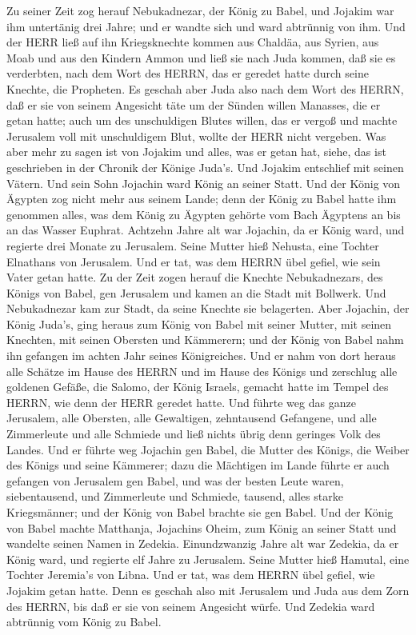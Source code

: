  Zu seiner Zeit zog herauf Nebukadnezar, der König zu Babel,
und Jojakim war ihm untertänig drei Jahre; und er wandte sich und ward
abtrünnig von ihm.  Und der HERR ließ auf ihn Kriegsknechte
kommen aus Chaldäa, aus Syrien, aus Moab und aus den Kindern Ammon und
ließ sie nach Juda kommen, daß sie es verderbten, nach dem Wort des
HERRN, das er geredet hatte durch seine Knechte, die Propheten.
 Es geschah aber Juda also nach dem Wort des HERRN, daß er
sie von seinem Angesicht täte um der Sünden willen Manasses, die er
getan hatte;  auch um des unschuldigen Blutes willen, das er
vergoß und machte Jerusalem voll mit unschuldigem Blut, wollte der HERR
nicht vergeben.  Was aber mehr zu sagen ist von Jojakim und
alles, was er getan hat, siehe, das ist geschrieben in der Chronik der
Könige Juda's.  Und Jojakim entschlief mit seinen Vätern.
Und sein Sohn Jojachin ward König an seiner Statt.  Und der
König von Ägypten zog nicht mehr aus seinem Lande; denn der König zu
Babel hatte ihm genommen alles, was dem König zu Ägypten gehörte vom
Bach Ägyptens an bis an das Wasser Euphrat.  Achtzehn Jahre
alt war Jojachin, da er König ward, und regierte drei Monate zu
Jerusalem. Seine Mutter hieß Nehusta, eine Tochter Elnathans von
Jerusalem.  Und er tat, was dem HERRN übel gefiel, wie sein
Vater getan hatte.  Zu der Zeit zogen herauf die Knechte
Nebukadnezars, des Königs von Babel, gen Jerusalem und kamen an die
Stadt mit Bollwerk.  Und Nebukadnezar kam zur Stadt, da
seine Knechte sie belagerten.  Aber Jojachin, der König
Juda's, ging heraus zum König von Babel mit seiner Mutter, mit seinen
Knechten, mit seinen Obersten und Kämmerern; und der König von Babel
nahm ihn gefangen im achten Jahr seines Königreiches.  Und
er nahm von dort heraus alle Schätze im Hause des HERRN und im Hause des
Königs und zerschlug alle goldenen Gefäße, die Salomo, der König
Israels, gemacht hatte im Tempel des HERRN, wie denn der HERR geredet
hatte.  Und führte weg das ganze Jerusalem, alle Obersten,
alle Gewaltigen, zehntausend Gefangene, und alle Zimmerleute und alle
Schmiede und ließ nichts übrig denn geringes Volk des Landes.
 Und er führte weg Jojachin gen Babel, die Mutter des
Königs, die Weiber des Königs und seine Kämmerer; dazu die Mächtigen im
Lande führte er auch gefangen von Jerusalem gen Babel,  und
was der besten Leute waren, siebentausend, und Zimmerleute und Schmiede,
tausend, alles starke Kriegsmänner; und der König von Babel brachte sie
gen Babel.  Und der König von Babel machte Matthanja,
Jojachins Oheim, zum König an seiner Statt und wandelte seinen Namen in
Zedekia.  Einundzwanzig Jahre alt war Zedekia, da er König
ward, und regierte elf Jahre zu Jerusalem. Seine Mutter hieß Hamutal,
eine Tochter Jeremia's von Libna.  Und er tat, was dem
HERRN übel gefiel, wie Jojakim getan hatte.  Denn es
geschah also mit Jerusalem und Juda aus dem Zorn des HERRN, bis daß er
sie von seinem Angesicht würfe. Und Zedekia ward abtrünnig vom König zu
Babel.

